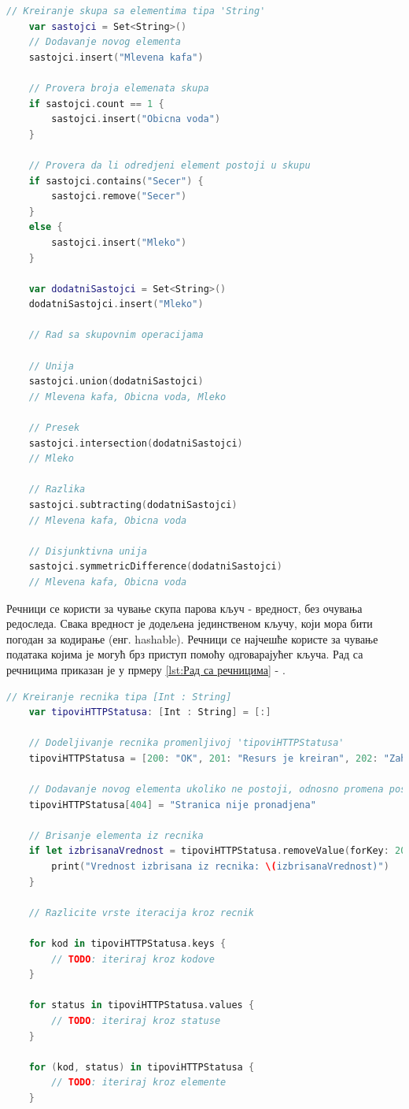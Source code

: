\documentclass[12pt,oneside]{memoir}
\begin{document}
\begin{lstlisting}[caption=\textit{{Рад са скуповима}}, label={lst:Рад са скуповима}, language=Swift, frame=single]
    // Kreiranje skupa sa elementima tipa 'String'
    var sastojci = Set<String>()
    // Dodavanje novog elementa
    sastojci.insert("Mlevena kafa")
    
    // Provera broja elemenata skupa
    if sastojci.count == 1 {
        sastojci.insert("Obicna voda")
    }
    
    // Provera da li odredjeni element postoji u skupu
    if sastojci.contains("Secer") {
        sastojci.remove("Secer")
    }
    else {
        sastojci.insert("Mleko")
    }
    
    var dodatniSastojci = Set<String>()
    dodatniSastojci.insert("Mleko")
    
    // Rad sa skupovnim operacijama
    
    // Unija
    sastojci.union(dodatniSastojci)
    // Mlevena kafa, Obicna voda, Mleko
    
    // Presek
    sastojci.intersection(dodatniSastojci)
    // Mleko
    
    // Razlika
    sastojci.subtracting(dodatniSastojci)
    // Mlevena kafa, Obicna voda
    
    // Disjunktivna unija
    sastojci.symmetricDifference(dodatniSastojci)
    // Mlevena kafa, Obicna voda
\end{lstlisting}

\indent Речници се користи за чување скупа парова кључ - вредност, без очувања редоследа. Свака вредност је додељена јединственом кључу, који мора бити погодан за кодирање (енг. hashable). Речници се најчешће користе за чување података којима је могућ брз приступ помоћу одговарајућег кључа. Рад са речницима приказан је у прмеру \ref{lst:Рад са речницима} - .

\begin{lstlisting}[caption=\textit{{Рад са речницима}}, label={lst:Рад са речницима}, language=Swift, frame=single]
    // Kreiranje recnika tipa [Int : String]
    var tipoviHTTPStatusa: [Int : String] = [:]
    
    // Dodeljivanje recnika promenljivoj 'tipoviHTTPStatusa'
    tipoviHTTPStatusa = [200: "OK", 201: "Resurs je kreiran", 202: "Zahtev je prihvacen"]
    
    // Dodavanje novog elementa ukoliko ne postoji, odnosno promena postojeceg
    tipoviHTTPStatusa[404] = "Stranica nije pronadjena"
    
    // Brisanje elementa iz recnika
    if let izbrisanaVrednost = tipoviHTTPStatusa.removeValue(forKey: 201) {
        print("Vrednost izbrisana iz recnika: \(izbrisanaVrednost)")
    }
    
    // Razlicite vrste iteracija kroz recnik
    
    for kod in tipoviHTTPStatusa.keys {
        // TODO: iteriraj kroz kodove
    }
    
    for status in tipoviHTTPStatusa.values {
        // TODO: iteriraj kroz statuse
    }

    for (kod, status) in tipoviHTTPStatusa {
        // TODO: iteriraj kroz elemente
    }
\end{lstlisting}
\end{document}
